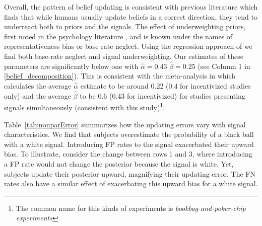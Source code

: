 \documentclass[12pt,a4paper]{article}
\begin{document}
\begin{figure}[H]
	\hfill
	\hfill
\end{figure}

Overall, the pattern of belief updating is consistent with previous literature which finds that while humans usually update beliefs in a correct direction, they tend to underreact both to priors and the signals. The effect of underweighting priors, first noted in the psychology literature \citep*{phillips_conservatism_1966-1, tversky_belief_1971, kahneman_subjective_1972}, and is known under the names of representativeness bias or base rate neglect. Using the regression approach of \citet{grether_bayes_1980} we find both base-rate neglect and signal underweighting. Our estimates of these parameters are significantly below one with $\hat \alpha=0.43$ $\hat \beta=0.25$ (see Column 1 in \ref{belief_decomposition}). This is consistent with the meta-analysis in \citet{benjamin_chapter_2019} which calculates the average $\hat \alpha$ estimate to be around 0.22 (0.4 for incentivized studies only) and the average $\hat \beta$ to be 0.6 (0.43 for incentivized) for studies presenting signals simultaneously (consistent with this study)\footnote{The common name for this kinds of experiments is \textit{bookbag-and-poker-chip experiments}}. 

Table~\ref{tab:nonparError} summarizes how the updating errors vary with signal characteristics. We find that subjects overestimate the probability of a black ball with a white signal. Introducing FP rates to the signal exacerbated their upward bias. To illustrate, consider the change between rows 1 and 3, where introducing a FP rate would not change the posterior because the signal is white. Yet, subjects update their posterior upward, magnifying their updating error. The FN rates also have a similar effect of exacerbating this upward bias for a white signal.
\end{document}
